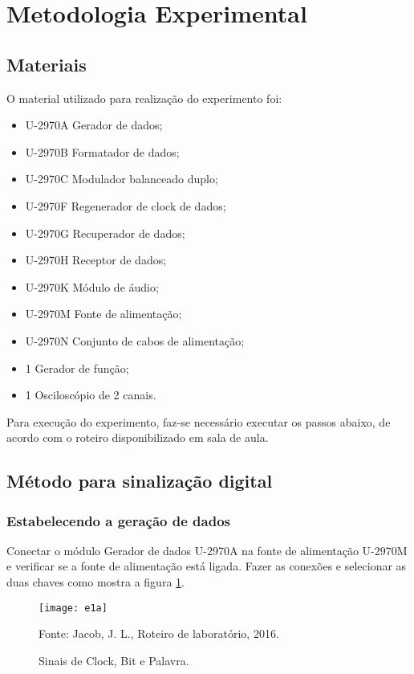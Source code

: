 \newpage
\section{Metodologia Experimental}

    \subsection{Materiais}
        O material utilizado para realização do experimento foi:

        \begin{itemize}
            \item U-2970A Gerador de dados;
            \item U-2970B Formatador de dados;
            \item U-2970C Modulador balanceado duplo;
            \item U-2970F Regenerador de clock de dados;
            \item U-2970G Recuperador de dados;
            \item U-2970H Receptor de dados;
            \item U-2970K Módulo de áudio;
            \item U-2970M Fonte de alimentação;
            \item U-2970N Conjunto de cabos de alimentação;
            \item 1 Gerador de função;
            \item 1 Osciloscópio de 2 canais.
        \end{itemize}

        Para execução do experimento, faz-se necessário executar os passos abaixo, de acordo com o roteiro disponibilizado em sala de aula.

    \subsection{Método para sinalização digital}
        \subsubsection{Estabelecendo a geração de dados}
            Conectar o módulo Gerador de dados U-2970A na fonte de alimentação U-2970M e verificar se a fonte de alimentação está ligada. Fazer as conexões e selecionar as duas chaves como mostra a figura \ref{fig:e1a}.
        
            \begin{figure}[H]
                \centering
                \caption{Sinais de Clock, Bit e Palavra.}
                \texttt{[image: e1a]}
            
                \small Fonte: Jacob, J. L., Roteiro de laboratório, 2016.
                \label{fig:e1a}
            \end{figure}
        
